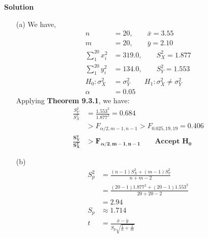 \documentclass{uofa-eng-assignment}
\begin{document}
\begin{enumerate}
        \textbf{Solution}
        \begin{itemize}
            \item[(a)]
                We have,
                \begin{align*}
                    n                  & = 20, \qquad \bar{x} = 3.55                         \\
                    m                  & = 20, \qquad \bar{y} = 2.10                         \\
                    \sum_{1}^{20}x_i^2 & = 319.0, \qquad S_X^2 = 1.877                       \\
                    \sum_{1}^{20}y_i^2 & = 134.0, \qquad S_Y^2 = 1.553                       \\
                    H_0: \sigma_X^2    & = \sigma_Y^2 \qquad H_1: \sigma_X^2 \neq \sigma_Y^2 \\
                    \alpha             & = 0.05
                \end{align*}
                Applying \textbf{Theorem 9.3.1}, we have:
                \begin{align*}
                    \frac{S_Y^2}{S_X^2}              & = \frac{1.553^2}{1.877^2} = 0.684                                              \\
                                                     & > F_{\alpha/2, m-1, n-1} > F_{0.025, 19, 19} = 0.406                           \\
                    \boldsymbol{\frac{S_Y^2}{S_X^2}} & > \boldsymbol{F_{\alpha/2, m-1, n-1}} \qquad \textbf{Accept } \boldsymbol{H_0}
                \end{align*}
            \item[(b)]
                \begin{align*}
                    S_p^2          & = \frac{(n-1)S_X^2 + (m-1)S_Y^2}{n+m-2}                                  \\
                                   & = \frac{(20-1)1.877^2 + (20-1)1.553^2}{20+20-2}                          \\
                                   & = 2.94                                                                   \\
                    S_p            & \approx 1.714                                                            \\
                    t              & = \frac{\bar{x} - \bar{y}}{S_p\sqrt{\frac{1}{n} + \frac{1}{m}}}          \\

\end{align*}
\end{itemize}
\end{enumerate}
\end{document}
